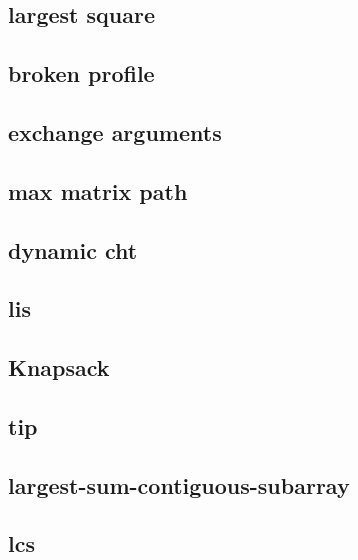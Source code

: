 \subsection{largest square}
\raggedbottom
\hrulefill
\subsection{broken profile}
\raggedbottom
\hrulefill
\subsection{exchange arguments}
\raggedbottom
\hrulefill
\subsection{max matrix path}
\raggedbottom
\hrulefill
\subsection{dynamic cht}
\raggedbottom
\hrulefill
\subsection{lis}
\raggedbottom
\hrulefill
\subsection{Knapsack}
\raggedbottom
\hrulefill
\subsection{tip}
\raggedbottom
\hrulefill
\subsection{largest-sum-contiguous-subarray}
\raggedbottom
\hrulefill
\subsection{lcs}
\raggedbottom
\hrulefill
